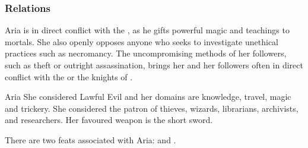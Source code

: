 \subsubsection{Relations}

Aria is in direct conflict with the , as he gifts
powerful magic and teachings to mortals. She also openly opposes anyone who
seeks to investigate unethical practices such as necromancy. The
uncompromising methods of her followers, such as theft or outright
assassination, brings her and her followers often in direct conflict with the
 or the knights of .

\begin{35e}{Aria}
  She considered Lawful Evil and her domains are knowledge, travel, magic and
  trickery. She considered the patron of thieves, wizards, librarians,
  archivists, and researchers. Her favoured weapon is the short sword.

  There are two feats associated with Aria:  and
  .
\end{35e}
